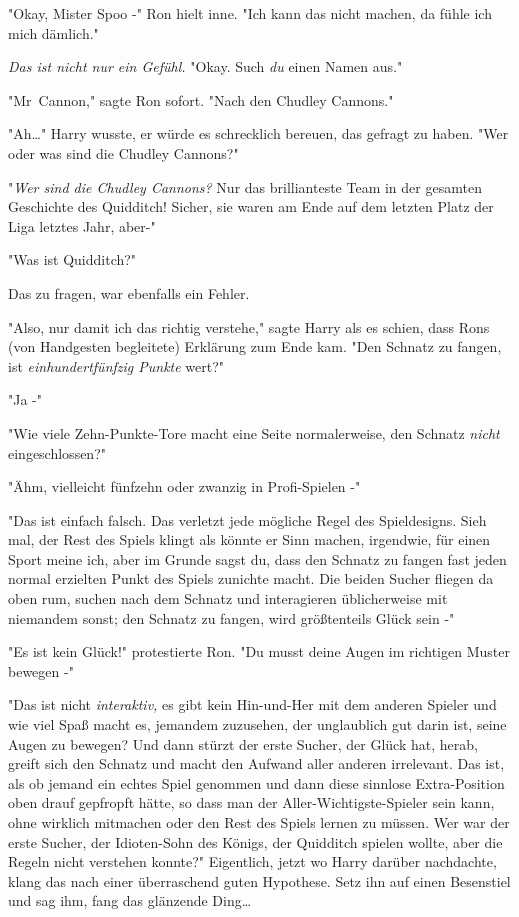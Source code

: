 {"Okay, Mister Spoo -" Ron hielt inne. "Ich kann das nicht machen, da fühle ich mich dämlich."

\emph{Das ist nicht nur ein Gefühl.} "Okay. Such \emph{du} einen Namen aus."

"Mr~Cannon," sagte Ron sofort. "Nach den Chudley Cannons."

"Ah…" Harry wusste, er würde es schrecklich bereuen, das gefragt zu haben. "Wer oder was sind die Chudley Cannons?"

"\emph{Wer sind die Chudley Cannons?} Nur das brillianteste Team in der gesamten Geschichte des Quidditch! Sicher, sie waren am Ende auf dem letzten Platz der Liga letztes Jahr, aber-"

"Was ist Quidditch?"

Das zu fragen, war ebenfalls ein Fehler.

"Also, nur damit ich das richtig verstehe," sagte Harry als es schien, dass Rons (von Handgesten begleitete) Erklärung zum Ende kam. "Den Schnatz zu fangen, ist \emph{einhundertfünfzig Punkte} wert?"

"Ja -"

"Wie viele Zehn-Punkte-Tore macht eine Seite normalerweise, den Schnatz \emph{nicht} eingeschlossen?"

"Ähm, vielleicht fünfzehn oder zwanzig in Profi-Spielen -"

"Das ist einfach falsch. Das verletzt jede mögliche Regel des Spieldesigns. Sieh mal, der Rest des Spiels klingt als könnte er Sinn machen, irgendwie, für einen Sport meine ich, aber im Grunde sagst du, dass den Schnatz zu fangen fast jeden normal erzielten Punkt des Spiels zunichte macht. Die beiden Sucher fliegen da oben rum, suchen nach dem Schnatz und interagieren üblicherweise mit niemandem sonst; den Schnatz zu fangen, wird größtenteils Glück sein -"

"Es ist kein Glück!" protestierte Ron. "Du musst deine Augen im richtigen Muster bewegen -"

"Das ist nicht \emph{interaktiv,} es gibt kein Hin-und-Her mit dem anderen Spieler und wie viel Spaß macht es, jemandem zuzusehen, der unglaublich gut darin ist, seine Augen zu bewegen? Und dann stürzt der erste Sucher, der Glück hat, herab, greift sich den Schnatz und macht den Aufwand aller anderen irrelevant. Das ist, als ob jemand ein echtes Spiel genommen und dann diese sinnlose Extra-Position oben drauf gepfropft hätte, so dass man der Aller-Wichtigste-Spieler sein kann, ohne wirklich mitmachen oder den Rest des Spiels lernen zu müssen. Wer war der erste Sucher, der Idioten-Sohn des Königs, der Quidditch spielen wollte, aber die Regeln nicht verstehen konnte?" Eigentlich, jetzt wo Harry darüber nachdachte, klang das nach einer überraschend guten Hypothese. Setz ihn auf einen Besenstiel und sag ihm, fang das glänzende Ding…

}
